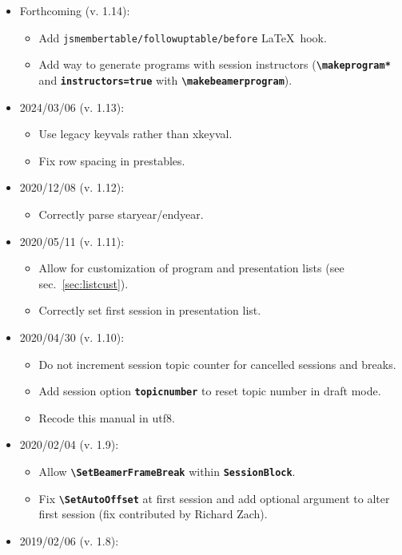 \documentclass[english]{article}
\newcommand*\jmacro[1]{\textbf{\texttt{#1}}}
\newcommand*\jcsmacro[1]{\jmacro{\textbackslash{#1}}}
\newcommand*\joption[1]{\textbf{\texttt{#1}}}
\begin{document}
\begin{itemize}
\item Forthcoming (v. 1.14):
\begin{itemize}
	\item Add \texttt{jsmembertable/followuptable/before} \LaTeX\ hook.
	\item Add way to generate programs with session instructors
	      (\jcsmacro{makeprogram*} and \joption{instructors=true}
	       with \jcsmacro{makebeamerprogram}).
\end{itemize}
\item 2024/03/06 (v. 1.13):
\begin{itemize}
	\item Use legacy keyvals rather than \textsf{xkeyval}.
	\item Fix row spacing in prestables.
\end{itemize}
\item 2020/12/08 (v. 1.12):
	\begin{itemize}
		\item Correctly parse staryear/endyear.
	\end{itemize}
\item 2020/05/11 (v. 1.11):
	\begin{itemize}
		\item Allow for customization of program and presentation lists (see sec.~\ref{sec:listcust}).
		\item Correctly set first session in presentation list.
	\end{itemize}
\item 2020/04/30 (v. 1.10):
	\begin{itemize}
		\item Do not increment session topic counter for cancelled sessions and breaks.
		\item Add session option \joption{topicnumber} to reset topic number in draft mode.
		\item Recode this manual in utf8.
	\end{itemize}
\item 2020/02/04 (v. 1.9):
	\begin{itemize}
		\item Allow \jcsmacro{SetBeamerFrameBreak} within \joption{SessionBlock}.
		\item Fix \jcsmacro{SetAutoOffset} at first session and add optional argument
		      to alter first session (fix contributed by Richard Zach).
	\end{itemize}
\item 2019/02/06 (v. 1.8):

\end{itemize}
\end{document}
